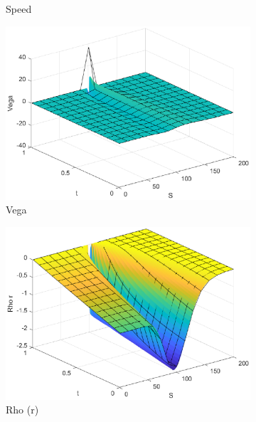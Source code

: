 \begin{figure}[H]
\begin{subfigure}[b]{0.35\linewidth}
        \caption{Speed}
    \end{subfigure}
    \begin{subfigure}[b]{0.35\linewidth}
        \includegraphics[width=\linewidth]{Imagenes/Parte1/6_Sols/Binary_Put/Binary_Put_Vega.eps}
        \caption{Vega}
    \end{subfigure}
    \begin{subfigure}[b]{0.35\linewidth}
        \includegraphics[width=\linewidth]{Imagenes/Parte1/6_Sols/Binary_Put/Binary_Put_Rho_r.eps}
        \caption{Rho (r)}
    \end{subfigure}
    \begin{subfigure}[b]{0.35\linewidth}

\end{subfigure}
\end{figure}
